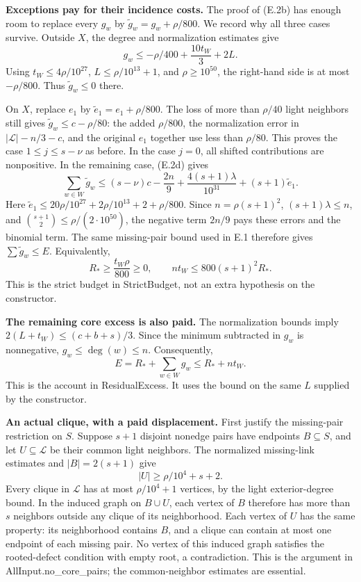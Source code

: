 \documentclass[english,11pt,a4paper]{article}
\newcounter{none}
\begin{document}
\textbf{Exceptions pay for their incidence costs.} The proof of (E.2b) has enough room to replace every \(g_w\) by \(\widetilde g_w=g_w+\rho/800\). We record why all three cases survive. Outside \(X\), the degree and normalization estimates give \[
g_w\le-\rho/400+\frac{10t_W}{3}+2L.
\] Using \(t_W\le4\rho/10^{27}\), \(L\le\rho/10^{13}+1\), and \(\rho\ge10^{50}\), the right-hand side is at most \(-\rho/800\). Thus \(\widetilde g_w\le0\) there.

On \(X\), replace \(e_1\) by \(\widetilde e_1=e_1+\rho/800\). The loss of more than \(\rho/40\) light neighbors still gives \(\widetilde g_w\le c-\rho/80\): the added \(\rho/800\), the normalization error in \(|\mathcal L|-n/3-c\), and the original \(e_1\) together use less than \(\rho/80\). This proves the case \(1\le j\le s-\nu\) as before. In the case \(j=0\), all shifted contributions are nonpositive. In the remaining case, (E.2d) gives \[
\sum_{w\in W}\widetilde g_w
\le(s-\nu)c-\frac{2n}{9}+
  \frac{4(s+1)\lambda}{10^{31}}+(s+1)\widetilde e_1.
\] Here \(\widetilde e_1\le20\rho/10^{27}+2\rho/10^{13}+2+\rho/800\). Since \(n=\rho(s+1)^2\), \((s+1)\lambda\le n\), and \(\binom{s+1}{2}\le\rho/(2\cdot10^{50})\), the negative term \(2n/9\) pays these errors and the binomial term. The same missing-pair bound used in E.1 therefore gives \(\sum\widetilde g_w\le E\). Equivalently, \[
R_*\ge\frac{t_W\rho}{800}\ge0,\qquad
nt_W\le800(s+1)^2R_*.
\tag{E.10}
\] This is the strict budget in {\ttfamily\small StrictBudget}, not an extra hypothesis on the constructor.

\textbf{The remaining core excess is also paid.} The normalization bounds imply \(2(L+t_W)\le(c+b+s)/3\). Since the minimum subtracted in \(g_w\) is nonnegative, \(g_w\le\deg(w)\le n\). Consequently, \[
E=R_*+\sum_{w\in W}g_w\le R_*+nt_W.
\tag{E.11}
\] This is the account in {\ttfamily\small ResidualExce\discretionary{\hbox{\ensuremath{\hookrightarrow}}}{}{}ss}. It uses the bound on the same \(L\) supplied by the constructor.

\textbf{An actual clique, with a paid displacement.} First justify the missing-pair restriction on \(S\). Suppose \(s+1\) disjoint nonedge pairs have endpoints \(B\subseteq S\), and let \(U\subseteq\mathcal L\) be their common light neighbors. The normalized missing-link estimates and \(|B|=2(s+1)\) give \[
|U|\ge\rho/10^4+s+2.
\] Every clique in \(\mathcal L\) has at most \(\rho/10^4+1\) vertices, by the light exterior-degree bound. In the induced graph on \(B\cup U\), each vertex of \(B\) therefore has more than \(s\) neighbors outside any clique of its neighborhood. Each vertex of \(U\) has the same property: its neighborhood contains \(B\), and a clique can contain at most one endpoint of each missing pair. No vertex of this induced graph satisfies the rooted-defect condition with empty root, a contradiction. This is the argument in {\ttfamily\small AllInput.\discretionary{\hbox{\ensuremath{\hookrightarrow}}}{}{}no\_\discretionary{\hbox{\ensuremath{\hookrightarrow}}}{}{}core\_\discretionary{\hbox{\ensuremath{\hookrightarrow}}}{}{}pairs}; the common-neighbor estimates are essential.
\end{document}
